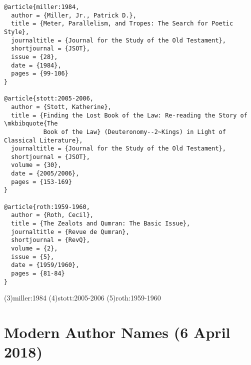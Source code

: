 \documentclass[a4paper]{article}
\begin{document}
\begin{verbatim}
@article{miller:1984,
  author = {Miller, Jr., Patrick D.},
  title = {Meter, Parallelism, and Tropes: The Search for Poetic Style},
  journaltitle = {Journal for the Study of the Old Testament},
  shortjournal = {JSOT},
  issue = {28},
  date = {1984},
  pages = {99-106}
}

@article{stott:2005-2006,
  author = {Stott, Katherine},
  title = {Finding the Lost Book of the Law: Re-reading the Story of \mkbibquote{The
           Book of the Law} (Deuteronomy--2~Kings) in Light of Classical Literature},
  journaltitle = {Journal for the Study of the Old Testament},
  shortjournal = {JSOT},
  volume = {30},
  date = {2005/2006},
  pages = {153-169}
}

@article{roth:1959-1960,
  author = {Roth, Cecil},
  title = {The Zealots and Qumran: The Basic Issue},
  journaltitle = {Revue de Qumran},
  shortjournal = {RevQ},
  volume = {2},
  issue = {5},
  date = {1959/1960},
  pages = {81-84}
}
\end{verbatim}

\examplecite(3){miller:1984}
\examplecite(4){stott:2005-2006}
\examplecite(5){roth:1959-1960}
\exampleabbreviations
\examplebibliography
{}

\section{Modern Author Names (6 April 2018)}
\end{document}
